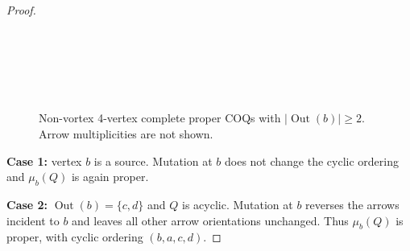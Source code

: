 \documentclass[11pt, letterpaper]{amsart}
\theoremstyle{definition}
\numberwithin{equation}{section}
\def\Out{{\operatorname{Out}}}
\begin{document}
\begin{proof}
\begin{figure}[ht]%
{
\newcommand{\radius}{1.2cm} %
\newcommand{\out}{-{stealth}}
\newcommand{\ine}{{stealth}-}
\newcommand\OriQuiv[9]{%
	\filldraw[black] (#1,#2)++(135:\radius) circle (2pt) node[above left=-1pt] {$a$} coordinate (a);
	\filldraw[black] (#1,#2)++(45:\radius) circle (2pt) node[above right=-1pt] {$b$} coordinate (b);
	\filldraw[black] (#1,#2)++(-45:\radius) circle (2pt) node[below right=-1pt] {$c$} coordinate (c);
	\filldraw[black] (#1,#2)++(-135:\radius) circle (2pt) node[below left=-1pt] {$d$} coordinate (d);
	\draw[black, dashed, decoration={markings, mark=at position 0 with {\arrow{<}}}, postaction={decorate}] (#1,#2) circle (\radius);
	\draw[black, #3, shorten >=3pt, shorten <= 3pt] (d) -- (a);
	\draw[black, #4, shorten >=3pt, shorten <= 3pt] (a) -- (b);
	\draw[black, #5, shorten >=3pt, shorten <= 3pt] (b) -- (c);
	\draw[black, #6, shorten >=3pt, shorten <= 3pt] (d) -- (b);
	\draw[black, #7, shorten >=3pt, shorten <= 3pt] (a) -- (c);
	\draw[black, #8, shorten >=3pt, shorten <= 3pt] (d) -- (c);
	\draw (#1,#2-\radius) node[below] {\textbf{#9}};
}
{\ \ }
{\ \ }
{\ \ }
} %
\caption{Non-vortex 4-vertex complete proper COQs with $|\Out(b)|\!\geq\!2$.
Arrow multiplicities are not shown.}
\label{fig:proper outgoing orientations}
\end{figure}

\textbf{Case 1:} vertex $b$ is a source. 
Mutation at $b$ does not change the cyclic ordering and $\mu_b(Q)$ is again proper.

\textbf{Case 2:} $\Out(b)=\{c,d\}$ and $Q$ is acyclic. 
Mutation at $b$ reverses the arrows incident to $b$ and leaves all other arrow orientations unchanged.
Thus $\mu_b(Q)$ is proper, with cyclic ordering $(b,a,c,d)$.


\end{proof}
\end{document}
